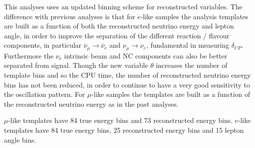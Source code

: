 

This analyses uses an updated binning scheme for reconstructed variables.
The difference with previous analyses is that
for $e$-like samples the analysis templates are built as a function of both 
the reconstructed neutrino energy and lepton angle,
in order to improve the separation of the different reaction / flavour components,
in particular $\bar{\nu}_{\mu} \rightarrow \bar{\nu}_e$ and $\nu_{\mu} \rightarrow \nu_e$,
fundamental in measuring $\delta_{CP}$.
Furthermore the $\nu_e$ intrinsic beam and NC components can also be better separated from signal.
Though the new variable $\theta$ increases the number of template bins and so the CPU time,
the number of reconstructed neutrino energy bins has not been reduced,
in order to continue to have a very good sensitivity to the oscillation pattern.
For $\mu$-like samples the templates are built as a function of the reconstructed neutrino energy
as in the past analyses.

$\mu$-like templates have 84 true energy bins and 73 reconstructed energy bins. $e$-like templates
have 84 true energy bins, 25 reconstructed energy bins and 15 lepton angle bins.

